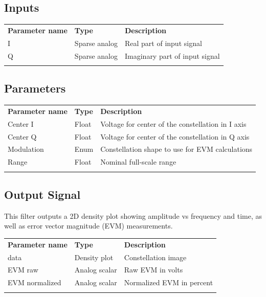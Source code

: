 \FloatBarrier

\subsection{Inputs}

\begin{tabularx}{16cm}{llX}
\thickhline
\textbf{Parameter name} & \textbf{Type} & \textbf{Description} \\
\thickhline
I & Sparse analog & Real part of input signal\\
\thinhline
Q & Sparse analog & Imaginary part of input signal\\
\thickhline
\end{tabularx}

\subsection{Parameters}

\begin{tabularx}{16cm}{llX}
\thickhline
\textbf{Parameter name} & \textbf{Type} & \textbf{Description} \\
\thickhline
Center I & Float & Voltage for center of the constellation in I axis\\
\thinhline
Center Q & Float & Voltage for center of the constellation in Q axis\\
\thinhline
Modulation & Enum & Constellation shape to use for EVM calculations\\
\thinhline
Range & Float & Nominal full-scale range\\
\thickhline
\end{tabularx}

\subsection{Output Signal}

This filter outputs a 2D density plot showing amplitude vs frequency and time, as well as error vector magnitude (EVM)
measurements.

\begin{tabularx}{16cm}{llX}
\thickhline
\textbf{Parameter name} & \textbf{Type} & \textbf{Description} \\
\thickhline
data & Density plot & Constellation image\\
\thinhline
EVM raw & Analog scalar & Raw EVM in volts\\
\thinhline
EVM normalized & Analog scalar & Normalized EVM in percent\\
\thickhline
\end{tabularx}

